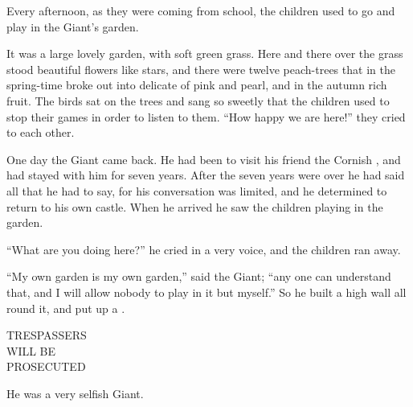 \documentclass[troisieme]{fiche}
\begin{document}
\begin{texte}
Every afternoon, as they were coming from school, the children used to go and play in the
Giant's garden.

It was a large lovely garden, with soft green grass. Here and there over the grass stood
beautiful flowers like stars, and there were twelve peach-trees that in the spring-time broke
out into delicate  of pink and pearl, and in the
autumn  rich fruit. The birds sat on the trees and
sang so sweetly that the children used to stop their games in order to listen to them. ``How
happy we are here!'' they cried to each other.

One day the Giant came back. He had been to visit his friend the Cornish
, and had stayed with him for seven years. After the seven years
were over he had said all that he had to say, for his conversation was limited, and he
determined to return to his own castle. When he arrived he saw the children playing in the
garden.

``What are you doing here?'' he cried in a very  voice, and the
children ran away.

``My own garden is my own garden,'' said the Giant; ``any one can understand that, and I will
allow nobody to play in it but myself.'' So he built a high wall all round it, and put up a
.

\begin{center}\sffamily\small
TRESPASSERS\\ WILL BE\\ PROSECUTED
\end{center}

He was a very selfish Giant.
\end{texte}

\end{document}
